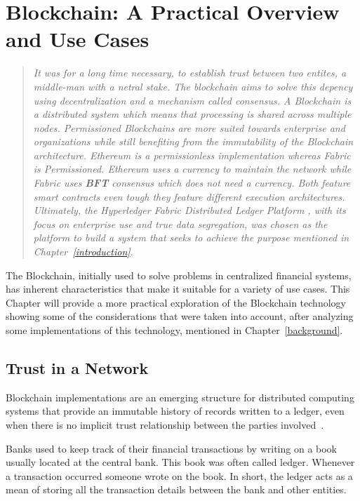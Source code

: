 \chapter{Blockchain: A Practical Overview and Use Cases}\label{blockchain}

\begin{quote} 
  \emph{It was for a long time necessary, to establish trust between two
  entites, a middle-man with a netral stake. The blockchain aims to solve this
  depency using decentralization and a mechanism called consensus. A Blockchain
  is a distributed system which means that processing is shared across multiple
  nodes. Permissioned Blockchains are more suited towards enterprise and
  organizations while still benefiting from the immutability of the Blockchain
  architecture. Ethereum is a permissionless implementation whereas Fabric is
  Permissioned. Ethereum uses a currency to maintain the network while Fabric
  uses \textbf{BFT} consensus which does not need a currency. Both feature
  smart contracts even tough they feature different execution architectures.
  Ultimately, the Hyperledger Fabric Distributed Ledger Platform , with its
  focus on enterprise use and true data segregation, was chosen as the platform
  to build a system that seeks to achieve the purpose mentioned in
  Chapter~\ref{introduction}.}
\end{quote}

The Blockchain, initially used to solve problems in centralized financial
systems, has inherent characteristics that make it suitable for a variety of
use cases. This Chapter will provide a more practical exploration of the
Blockchain technology showing some of the considerations that were taken into
account, after analyzing some implementations of this technology, mentioned in
Chapter~\ref{background}.

\section{Trust in a Network}

Blockchain implementations are an emerging structure for distributed computing
systems that provide an immutable history of records written to a ledger, even
when there is no implicit trust relationship between the parties
involved~\cite{Barclay2017}.

Banks used to keep track of their financial transactions by writing on a book
usually located at the central bank. This book was often called ledger.
Whenever a transaction occurred someone wrote on the book. In short, the ledger
acts as a mean of storing all the transaction details between the bank and
other entities. 

